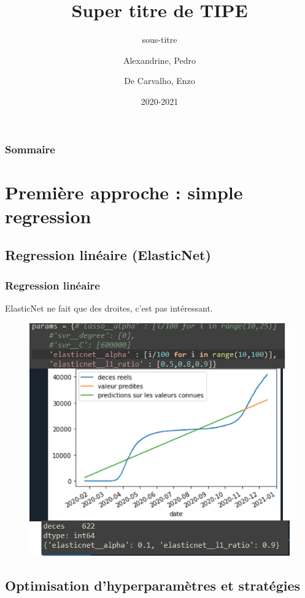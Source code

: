 \documentclass{beamer}
\title{Super titre de TIPE}
\subtitle{sous-titre}
\author{Alexandrine, Pedro\\\and De Carvalho, Enzo}
\date{2020-2021}
\begin{document}
\begin{frame}
	\maketitle
\end{frame}

\begin{frame}
	\frametitle{Sommaire}
	\tableofcontents
\end{frame}

\section{Première approche : simple regression}
\subsection{Regression linéaire (ElasticNet)}
\begin{frame}
	\frametitle{Regression linéaire}
	ElasticNet ne fait que des droites, c'est pas intéressant.
	\begin{figure}[b]
		\includegraphics[scale=0.4]{EN}
		\centering
	\end{figure}
\end{frame}

\subsection{Optimisation d'hyperparamètres et stratégies}
\end{document}
